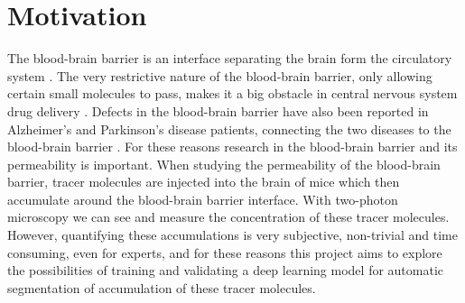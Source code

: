 \section{Motivation}
The blood-brain barrier is an interface separating the brain form the circulatory system \cite{swhati}. The very restrictive nature of the blood-brain barrier, only allowing certain small molecules to pass, makes it a big obstacle in central nervous system drug delivery \cite{swhati}. Defects in the blood-brain barrier have also been reported in Alzheimer's and Parkinson's disease patients, connecting the two diseases to the blood-brain barrier \cite{zhao}. For these reasons research in the blood-brain barrier and its permeability is important. When studying the permeability of the blood-brain barrier, tracer molecules are injected into the brain of mice which then accumulate around the blood-brain barrier interface. With two-photon microscopy we can see and measure the concentration of these tracer molecules. However, quantifying these accumulations is very subjective, non-trivial and time consuming, even for experts, and for these reasons this project aims to explore the possibilities of training and validating a deep learning model for automatic segmentation of accumulation of these tracer molecules.  